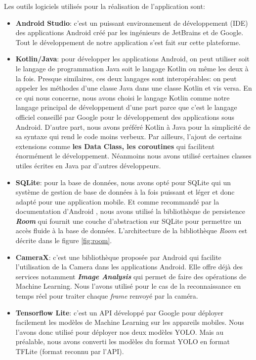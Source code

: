     Les outils logiciels utilisés pour la réalisation de l’application sont:
    \begin{itemize}
        \item \textbf{Android Studio}: c’est un puissant environnement de développement (IDE) des applications Android créé par les ingénieurs de JetBrains et de Google. Tout le développement de notre application s’est fait sur cette plateforme. 
        
        \item \textbf{Kotlin/Java}: pour développer les applications Android, on peut utiliser soit le langage de programmation Java soit le langage Kotlin ou même les deux à la fois. Presque similaires, ces deux langages sont interopérables: on peut appeler les méthodes d'une classe Java dans une classe Kotlin et vis versa. En ce qui nous concerne, nous avons choisi le langage Kotlin comme notre langage principal de développement d’une part parce que c’est le langage officiel conseillé par Google pour le développement des applications sous Android. D’autre part, nous avons préféré Kotlin à Java pour la simplicité de sa syntaxe qui rend le code moins verbeux. Par ailleurs, l’ajout de certains extensions comme \textbf{les Data Class, les coroutines} qui facilitent énormément le développement. Néanmoins nous avons utilisé certaines classes utiles écrites en Java par d'autres développeurs.  
        
        \item \textbf{SQLite}: pour la base de données, nous avons opté pour SQLite qui un système de gestion de base de données à la fois puissant et léger et donc adapté pour une application mobile. Et comme recommandé par la documentation d'Android \cite{androiddocs}, nous avons utilisé la bibliothèque de persistence \textbf{\textit{Room}} qui fournit une couche d'abstraction sur SQLite pour permettre un accès fluide à la base de données.
        L'architecture de la bibliothèque \textit{Room} est décrite dans le figure \ref{fig:room}.

        \item \textbf{CameraX}: c'est une bibliothèque proposée par Android qui facilite l'utilisation de la Camera dans les applications Android. Elle offre déjà des services notamment \textbf{\textit{Image Analysis}} qui permet de faire des opérations de Machine Learning. Nous l'avons utilisé pour le cas de la reconnaissance en temps réel pour traiter chaque \textit{frame} renvoyé par la caméra.
        
        \item \textbf{Tensorflow Lite}: c'est un API développé par Google pour déployer facilement les modèles de Machine Learning sur les appareils mobiles. Nous l'avons donc utilisé pour déployer nos deux modèles YOLO. Mais au préalable, nous avons converti les modèles du format YOLO en format TFLite (format reconnu par l'API).
        

\end{itemize}

